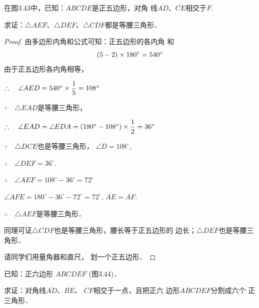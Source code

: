 \begin{example}
    在图3.43中，已知：$ABCDE$是正五边形，对角
    线$\overline{AD}$、$\overline{CE}$相交于$F$.

    求证：$\triangle AEF$、$\triangle DEF$、$\triangle CDF$都是等腰三角形．
\end{example}

\begin{proof}
由多边形内角和公式可知：正五边形的各内角
和
\[(5-2)\times180^{\circ}=540^{\circ}\]
由于正五边形各内角相等，

$\therefore\quad \angle AED=540^{\circ}\times\dfrac{1}{5}=108^{\circ}$

$\because\quad \triangle EAD$是等腰三角形，

$\therefore\quad \angle EAD=\angle EDA=(180^{\circ}-108^{\circ})\times\dfrac{1}{2}=36^{\circ}$

$\because\quad \triangle DCE$也是等腰三角形，
$\angle D=108^{\circ}$,

$\therefore\quad \angle DEF=36^{\circ}$.

$\therefore\quad \angle AEF=108^{\circ}-36^{\circ}=72^{\circ}$

$\angle AFE=180^{\circ}-36^{\circ}-72^{\circ}=72^{\circ}$, $\overline{AE}=\overline{AF}$.

$\therefore\quad \triangle AEF$是等腰三角形．

同理可证$\triangle CDF$也是等腰三角形，腰长等于正五边形的
边长；$\triangle DEF$也是等腰三角形．

请同学们用量角器和直尺，
划一个正五边形．
\end{proof}
    
\begin{example}
    已知：正六边形
    $ABCDEF$ (图3.44)．

    求证：对角线$\overline{AD}$、$\overline{BE}$、
    $\overline{CF}$相交于一点，且把正六
    边形$ABCDEF$分割成六个
    正三角形．
\end{example}

\begin{figure}[htp]
    \centering
{}
    \caption{}
\end{figure}

